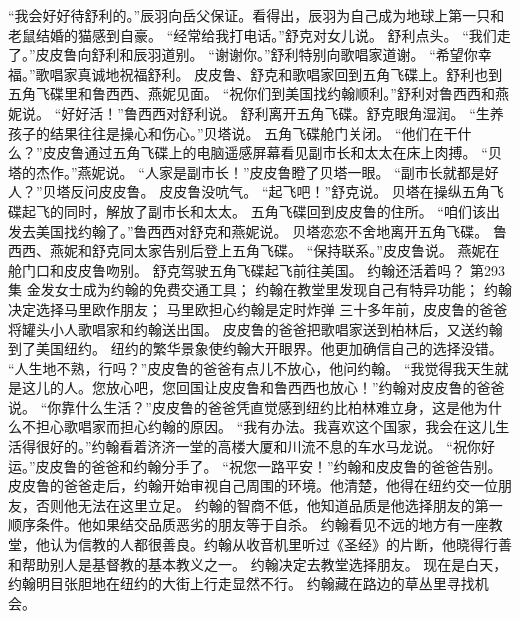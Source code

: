 \documentclass[a4paper,12pt,UTF8,twoside]{ctexbook}
\begin{document}
        “我会好好待舒利的。”辰羽向岳父保证。看得出，辰羽为自己成为地球上第一只和老鼠结婚的猫感到自豪。  
        “经常给我打电话。”舒克对女儿说。  
        舒利点头。  
        “我们走了。”皮皮鲁向舒利和辰羽道别。  
        “谢谢你。”舒利特别向歌唱家道谢。  
        “希望你幸福。”歌唱家真诚地祝福舒利。  
        皮皮鲁、舒克和歌唱家回到五角飞碟上。舒利也到五角飞碟里和鲁西西、燕妮见面。  
        “祝你们到美国找约翰顺利。”舒利对鲁西西和燕妮说。  
        “好好活！”鲁西西对舒利说。  
        舒利离开五角飞碟。舒克眼角湿润。  
        “生养孩子的结果往往是操心和伤心。”贝塔说。  
        五角飞碟舱门关闭。  
        “他们在干什么？”皮皮鲁通过五角飞碟上的电脑遥感屏幕看见副市长和太太在床上肉搏。  
        “贝塔的杰作。”燕妮说。  
        “人家是副市长！”皮皮鲁瞪了贝塔一眼。  
        “副市长就都是好人？”贝塔反问皮皮鲁。  
        皮皮鲁没吭气。  
        “起飞吧！”舒克说。  
        贝塔在操纵五角飞碟起飞的同时，解放了副市长和太太。  
        五角飞碟回到皮皮鲁的住所。  
        “咱们该出发去美国找约翰了。”鲁西西对舒克和燕妮说。  
        贝塔恋恋不舍地离开五角飞碟。  
        鲁西西、燕妮和舒克同太家告别后登上五角飞碟。  
        “保持联系。”皮皮鲁说。  
        燕妮在舱门口和皮皮鲁吻别。  
        舒克驾驶五角飞碟起飞前往美国。  
        约翰还活着吗？          第293集  
        金发女士成为约翰的免费交通工具；  
        约翰在教堂里发现自己有特异功能；  
        约翰决定选择马里欧作朋友；  
        马里欧担心约翰是定时炸弹    
        三十多年前，皮皮鲁的爸爸将罐头小人歌唱家和约翰送出国。  
        皮皮鲁的爸爸把歌唱家送到柏林后，又送约翰到了美国纽约。  
        纽约的繁华景象使约翰大开眼界。他更加确信自己的选择没错。  
        “人生地不熟，行吗？”皮皮鲁的爸爸有点儿不放心，他问约翰。  
        “我觉得我天生就是这儿的人。您放心吧，您回国让皮皮鲁和鲁西西也放心！”约翰对皮皮鲁的爸爸说。        
        “你靠什么生活？”皮皮鲁的爸爸凭直觉感到纽约比柏林难立身，这是他为什么不担心歌唱家而担心约翰的原因。  
        “我有办法。我喜欢这个国家，我会在这儿生活得很好的。”约翰看着济济一堂的高楼大厦和川流不息的车水马龙说。  
        “祝你好运。”皮皮鲁的爸爸和约翰分手了。  
        “祝您一路平安！”约翰和皮皮鲁的爸爸告别。  
        皮皮鲁的爸爸走后，约翰开始审视自己周围的环境。他清楚，他得在纽约交一位朋友，否则他无法在这里立足。  
        约翰的智商不低，他知道品质是他选择朋友的第一顺序条件。他如果结交品质恶劣的朋友等于自杀。  
        约翰看见不远的地方有一座教堂，他认为信教的人都很善良。约翰从收音机里听过《圣经》的片断，他晓得行善和帮助别人是基督教的基本教义之一。  
        约翰决定去教堂选择朋友。  
        现在是白天，约翰明目张胆地在纽约的大街上行走显然不行。  
        约翰藏在路边的草丛里寻找机会。  
\end{document}
